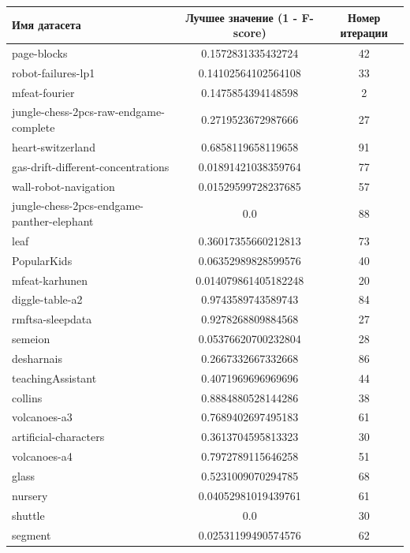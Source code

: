 \documentclass[times,specification,annotation]{itmo-student-thesis}
\begin{document}
	\begin{center}
		\begin{longtable}{ |m{5cm}|c|c| } 
			\hline
			\textbf{Имя датасета} & \textbf{Лучшее значение (1 - F-score)} & \textbf{Номер итерации} \\ 
			\hline\hline
			page-blocks & 0.1572831335432724 & 42 \\
			\hline
			robot-failures-lp1 & 0.14102564102564108 & 33 \\
			\hline
			mfeat-fourier & 0.1475854394148598 & 2 \\
			\hline
			jungle-chess-2pcs-raw-endgame-complete & 0.2719523672987666 & 27 \\
			\hline
			heart-switzerland & 0.6858119658119658 & 91 \\
			\hline
			gas-drift-different-concentrations & 0.01891421038359764 & 77 \\
			\hline
			wall-robot-navigation & 0.01529599728237685 & 57 \\
			\hline
			jungle-chess-2pcs-endgame-panther-elephant & 0.0 & 88 \\
			\hline
			leaf & 0.36017355660212813 & 73 \\
			\hline
			PopularKids & 0.06352989828599576 & 40 \\
			\hline
			mfeat-karhunen & 0.014079861405182248 & 20 \\
			\hline
			diggle-table-a2 & 0.9743589743589743 & 84 \\
			\hline
			rmftsa-sleepdata & 0.9278268809884568 & 27 \\
			\hline
			semeion & 0.05376620700232804 & 28 \\
			\hline
			desharnais & 0.2667332667332668 & 86 \\
			\hline
			teachingAssistant & 0.4071969696969696 & 44 \\
			\hline
			collins & 0.8884880528144286 & 38 \\
			\hline
			volcanoes-a3 & 0.7689402697495183 & 61 \\
			\hline
			artificial-characters & 0.3613704595813323 & 30 \\
			\hline
			volcanoes-a4 & 0.7972789115646258 & 51 \\
			\hline
			glass & 0.5231009070294785 & 68 \\
			\hline
			nursery & 0.04052981019439761 & 61 \\
			\hline
			shuttle & 0.0 & 30 \\
			\hline
			segment & 0.02531199490574576 & 62 \\

\end{longtable}
\end{center}
\end{document}

